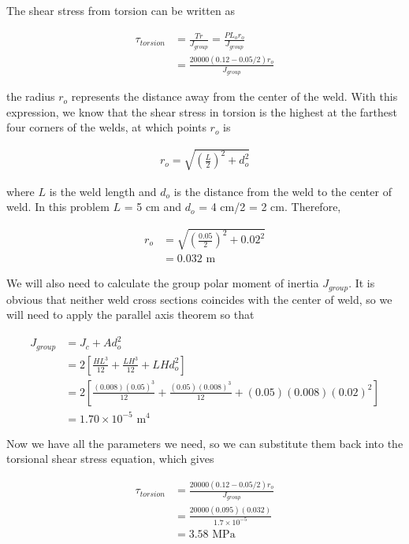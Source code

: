 \documentclass[a4paper,openany,12pt]{book}
\begin{document}
{{The shear stress from torsion can be written as

$$\begin{aligned}
    \tau_{torsion} &= \frac{Tr}{J_{group}} = \frac{P L_o r_o}{J_{group}} \\
                   &= \frac{20000(0.12-0.05/2) r_o}{J_{group}}
  \end{aligned}$$

the radius \(r_o\) represents the distance away from the center of the
weld. With this expression, we know that the shear stress in torsion is
the highest at the farthest four corners of the welds, at which points
\(r_o\) is

$$\begin{aligned}
    r_o = \sqrt{ \left( \frac{L}{2} \right)^2 + d_o^2 }
  \end{aligned}$$

where \(L\) is the weld length and \(d_o\) is the distance from the weld to
the center of weld. In this problem \(L\) = 5 cm and \(d_o\) = 4 cm/2 = 2
cm. Therefore,

$$\begin{aligned}
     r_o &= \sqrt{ \left( \frac{0.05}{2} \right)^2 + 0.02^2 } \\
         &= 0.032 \text{ m}
   \end{aligned}$$

We will also need to calculate the group polar moment of inertia
\(J_{group}\). It is obvious that neither weld cross sections coincides
with the center of weld, so we will need to apply the parallel axis
theorem so that

$$\begin{aligned}
     J_{group} &= J_c + A d_o^2 \\
               &= 2 \left[ \frac{HL^3}{12} +\frac{LH^3}{12} + LHd_o^2 \right] \\
               &= 2 \left[ \frac{(0.008)(0.05)^3}{12} + \frac{(0.05)(0.008)^3}{12} + (0.05)(0.008)(0.02)^2 \right] \\
               &= 1.70 \times 10^{-5} \text{ m}^4
   \end{aligned}$$

Now we have all the parameters we need, so we can substitute them back
into the torsional shear stress equation, which gives

$$\begin{aligned}
     \tau_{torsion} &= \frac{20000(0.12-0.05/2) r_o}{J_{group}} \\
                    &= \frac{20000(0.095)(0.032)}{1.7 \times 10^{-5}} \\
                    &= 3.58 \text{ MPa}
   \end{aligned}$$

}}
\end{document}
